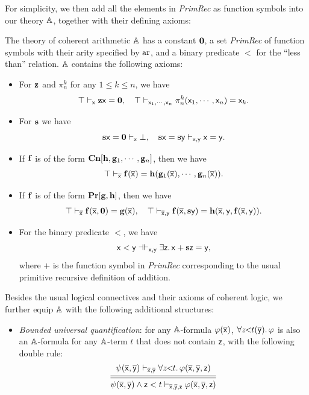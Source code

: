 For simplicity, we then add all the elements in \emph{PrimRec} as function symbols into our theory $\mathbb{A}$, together with their defining axioms:

\begin{definition}\label{def:coharith}
  The theory of coherent arithmetic $\mathbb{A}$ has a constant $\mathbf{0}$, a set \emph{PrimRec} of function symbols with their arity specified by $\mathrm{ar}$, and a binary predicate $<$ for the ``less than'' relation. $\mathbb{A}$ contains the following axioms:
  \begin{itemize}
  \item For $\mathbf{z}$ and $\pi_n^k$ for any $1 \le k \le n$, we have
    \[ \top \vdash_{\mathsf{x}} \mathbf{z}\mathsf{x} = \mathbf{0}, \quad \top \vdash_{\mathsf{x}_1,\cdots,\mathsf{x}_n} \pi_n^k(\mathsf{x}_1,\cdots,\mathsf{x}_n) = \mathsf{x}_k. \]
  \item For $\mathbf{s}$ we have
    \[ \mathbf{s}\mathsf{x} = \mathbf{0} \vdash_{\mathsf{x}} \bot, \quad \mathbf{s}\mathsf{x} = \mathbf{s}\mathsf{y} \vdash_{\mathsf{x},\mathsf{y}} \mathsf{x} = \mathsf{y}. \]
  \item If $\mathbf{f}$ is of the form $\mathbf{Cn}[\mathbf{h},\mathbf{g}_1,\cdots,\mathbf{g}_n]$, then we have
    \[ \top \vdash_{\overline{\mathsf{x}}} \mathbf{f}(\overline{\mathsf{x}}) = \mathbf{h}(\mathbf{g}_1(\overline{\mathsf{x}}),\cdots,\mathbf{g}_n(\overline{\mathsf{x}})). \]
  \item If $\mathbf{f}$ is of the form $\mathbf{Pr}[\mathbf{g},\mathbf{h}]$, then we have
    \[ \top \vdash_{\overline{\mathsf{x}}} \mathbf{f}(\overline{\mathsf{x}},\mathbf{0}) = \mathbf{g}(\overline{\mathsf{x}}), \quad \top \vdash_{\overline{\mathsf{x}},\mathsf{y}} \mathbf{f}(\overline{\mathsf{x}},\mathbf{s}\mathsf{y}) = \mathbf{h}(\overline{\mathsf{x}},\mathsf{y},\mathbf{f}(\overline{\mathsf{x}},\mathsf{y})). \]
  \item For the binary predicate $<$, we have
    \[ \mathsf{x} < \mathsf{y} \dashv\vdash_{\mathsf{x},\mathsf{y}} \exists \mathsf{z}.\,\mathsf{x} + \mathbf{s}\mathsf{z} = \mathsf{y}, \]
    where $+$ is the function symbol in \emph{PrimRec} corresponding to the usual primitive recursive definition of addition.
  \end{itemize}
  Besides the usual logical connectives and their axioms of coherent logic, we further equip $\mathbb{A}$ with the following additional structures:
  \begin{itemize}
  \item \emph{Bounded universal quantification}: for any $\mathbb{A}$-formula $\varphi(\overline{\mathsf{x}})$, $\forall z\!\!<\!\!t(\overline{\mathsf{y}}).\,\varphi$ is also an $\mathbb{A}$-formula for any $\mathbb{A}$-term $t$ that does not contain $\mathsf{z}$, with the following double rule:
    \[
      \begin{prooftree}
        \hypo{\psi(\ov{\ms x},\ov{\ms y}) \vdash_{\ov{\ms x},\ov{\ms y}} \buq z{t}\varphi(\ov{\ms x},\ov{\ms y},\ms z)}
        \infer[double]1{\psi(\ov{\ms x},\ov{\ms y}) \wedge \ms z < t \vdash_{\ov{\ms x},\ov{\ms y},\ms z} \varphi(\ov{\ms x},\ov{\ms y},\ms z)}

\end{prooftree}\]
\end{itemize}
\end{definition}
